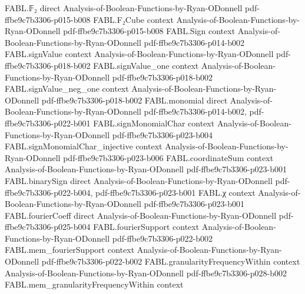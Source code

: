 \begin{theorem}
\leanok
{}
\proofstep
  {FABL.𝔽₂}
  {direct}
  {Analysis-of-Boolean-Functions-by-Ryan-ODonnell}
  {pdf-ffbe9c7b3306-p015-b008}
\proofstep
  {FABL.F₂Cube}
  {context}
  {Analysis-of-Boolean-Functions-by-Ryan-ODonnell}
  {pdf-ffbe9c7b3306-p015-b008}
\proofstep
  {FABL.Sign}
  {context}
  {Analysis-of-Boolean-Functions-by-Ryan-ODonnell}
  {pdf-ffbe9c7b3306-p014-b002}
\proofstep
  {FABL.signValue}
  {context}
  {Analysis-of-Boolean-Functions-by-Ryan-ODonnell}
  {pdf-ffbe9c7b3306-p018-b002}
\proofstep
  {FABL.signValue_one}
  {context}
  {Analysis-of-Boolean-Functions-by-Ryan-ODonnell}
  {pdf-ffbe9c7b3306-p018-b002}
\proofstep
  {FABL.signValue_neg_one}
  {context}
  {Analysis-of-Boolean-Functions-by-Ryan-ODonnell}
  {pdf-ffbe9c7b3306-p018-b002}
\proofstep
  {FABL.monomial}
  {direct}
  {Analysis-of-Boolean-Functions-by-Ryan-ODonnell}
  {pdf-ffbe9c7b3306-p014-b002,
    pdf-ffbe9c7b3306-p022-b001}
\proofstep
  {FABL.signMonomialChar}
  {context}
  {Analysis-of-Boolean-Functions-by-Ryan-ODonnell}
  {pdf-ffbe9c7b3306-p023-b004}
\proofstep
  {FABL.signMonomialChar_injective}
  {context}
  {Analysis-of-Boolean-Functions-by-Ryan-ODonnell}
  {pdf-ffbe9c7b3306-p023-b006}
\proofstep
  {FABL.coordinateSum}
  {context}
  {Analysis-of-Boolean-Functions-by-Ryan-ODonnell}
  {pdf-ffbe9c7b3306-p023-b001}
\proofstep
  {FABL.binarySign}
  {direct}
  {Analysis-of-Boolean-Functions-by-Ryan-ODonnell}
  {pdf-ffbe9c7b3306-p022-b004,
    pdf-ffbe9c7b3306-p023-b001}
\proofstep
  {FABL.χ}
  {context}
  {Analysis-of-Boolean-Functions-by-Ryan-ODonnell}
  {pdf-ffbe9c7b3306-p023-b001}
\proofstep
  {FABL.fourierCoeff}
  {direct}
  {Analysis-of-Boolean-Functions-by-Ryan-ODonnell}
  {pdf-ffbe9c7b3306-p025-b004}
\proofstep
  {FABL.fourierSupport}
  {context}
  {Analysis-of-Boolean-Functions-by-Ryan-ODonnell}
  {pdf-ffbe9c7b3306-p022-b002}
\proofstep
  {FABL.mem_fourierSupport}
  {context}
  {Analysis-of-Boolean-Functions-by-Ryan-ODonnell}
  {pdf-ffbe9c7b3306-p022-b002}
\proofstep
  {FABL.granularityFrequencyWithin}
  {context}
  {Analysis-of-Boolean-Functions-by-Ryan-ODonnell}
  {pdf-ffbe9c7b3306-p028-b002}
\proofstep
  {FABL.mem_granularityFrequencyWithin}
  {context}

\end{theorem}
